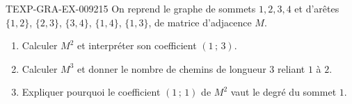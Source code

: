 \begin{exercice}{TEXP-GRA-EX-009}{2}{15}
On reprend le graphe de sommets $1,2,3,4$ et d'arêtes $\{1,2\}$, $\{2,3\}$,
$\{3,4\}$, $\{1,4\}$, $\{1,3\}$, de matrice d'adjacence $M$.
\begin{enumerate}
  \item Calculer $M^2$ et interpréter son coefficient $(1\,;\,3)$.
  \item Calculer $M^3$ et donner le nombre de chemins de longueur $3$ reliant
        $1$ à $2$.
  \item Expliquer pourquoi le coefficient $(1\,;\,1)$ de $M^2$ vaut le degré
        du sommet $1$.
\end{enumerate}
\end{exercice}
